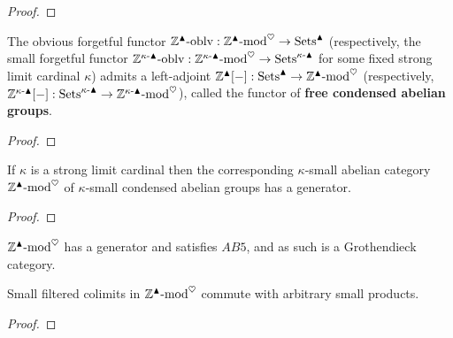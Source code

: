                 \begin{proof}
                    
                \end{proof}
            \begin{lemma} \label{lemma: free_condensed_abelian_groups}
                The obvious forgetful functor $\mathbb{Z}^{\blacktriangle}\text{-}\mathrm{oblv}: \mathbb{Z}^{\blacktriangle}\text{-}\mathrm{mod}^{\heartsuit} \to \mathrm{Sets}^{\blacktriangle}$ (respectively, the small forgetful functor $\mathbb{Z}^{\kappa\text{-}\blacktriangle}\text{-}\mathrm{oblv}: \mathbb{Z}^{\kappa\text{-}\blacktriangle}\text{-}\mathrm{mod}^{\heartsuit} \to \mathrm{Sets}^{\kappa\text{-}\blacktriangle}$ for some fixed strong limit cardinal $\kappa$) admits a left-adjoint $\mathbb{Z}^{\blacktriangle}[-]: \mathrm{Sets}^{\blacktriangle} \to \mathbb{Z}^{\blacktriangle}\text{-}\mathrm{mod}^{\heartsuit}$ (respectively, $\mathbb{Z}^{\kappa\text{-}\blacktriangle}[-]: \mathrm{Sets}^{\kappa\text{-}\blacktriangle} \to \mathbb{Z}^{\kappa\text{-}\blacktriangle}\text{-}\mathrm{mod}^{\heartsuit}$), called the functor of \textbf{free condensed abelian groups}. 
            \end{lemma}
                \begin{proof}
                    
                \end{proof}
            \begin{proposition} \label{prop: small_categories_of_condensed_abelian_groups_have_generators}
                If $\kappa$ is a strong limit cardinal then the corresponding $\kappa$-small abelian category $\mathbb{Z}^{\blacktriangle}\text{-}\mathrm{mod}^{\heartsuit}$ of $\kappa$-small condensed abelian groups has a generator.
            \end{proposition}
                \begin{proof}
                    
                \end{proof}
            \begin{corollary} \label{coro: small_categories_of_condensed_abelian_groups_are_grothendieck}
                $\mathbb{Z}^{\blacktriangle}\text{-}\mathrm{mod}^{\heartsuit}$ has a generator and satisfies $AB5$, and as such is a Grothendieck category.
            \end{corollary}
            \begin{proposition} \label{prop: the_category_of_condensed_abelian_groups_is_AB6}
                Small filtered colimits in $\mathbb{Z}^{\blacktriangle}\text{-}\mathrm{mod}^{\heartsuit}$ commute with arbitrary small products.
            \end{proposition}
                \begin{proof}
                    
                \end{proof}
                
